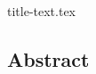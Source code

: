 \documentclass[letterpaper,twocolumn,10pt]{article}
\begin{document}
{title-text.tex}
\author{Anonymous Submission}

\maketitle

\subsection*{Abstract}
    



{\footnotesize
% 
% 


% 
}
\end{document}
